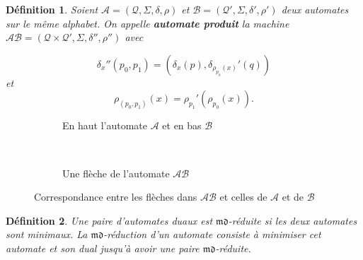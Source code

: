 \documentclass[11pt,a4paper]{article}
\newtheorem{definition}{Définition}
\begin{document}
\begin{definition}
  \label{def:produit}
  Soient $\mathcal{A} = \left(\mathcal{Q}, \Sigma, \delta, \rho\right)$ et $\mathcal{B} = \left(\mathcal{Q'}, \Sigma, \delta', \rho'\right)$ deux automates sur le même alphabet. On appelle \textbf{\textit{automate produit}} la machine $\mathcal{AB} = \left(\mathcal{Q}\times\mathcal{Q'}, \Sigma, \delta'', \rho''\right)$ avec

\[ \delta_x''(p_0, p_1) = (\delta_x(p), \delta_{\rho_{p_0}(x)}'(q))\]
et
\[ \rho_{(p_0,p_1)}(x) = \rho_{p_1}'(\rho_{p_0}(x)). \]
\end{definition}

\begin{figure}[h!]
  \begin{subfigure}[b]{0.5\textwidth}
    \centering
    \caption{En haut l'automate $\mathcal{A}$ et en bas $\mathcal{B}$}
  \end{subfigure}
  ~
  \begin{subfigure}[b]{0.5\textwidth}
    \centering
    \caption{Une flèche de l'automate $\mathcal{AB}$}
  \end{subfigure}
  \caption{Correspondance entre les flèches dans $\mathcal{AB}$ et celles de $\mathcal{A}$ et de $\mathcal{B}$}
\end{figure}

\begin{definition}{\cite{DBLP:journals/corr/abs-1105-4725}}
  \label{def:md-red}
  Une paire d'automates duaux est $\mathfrak{md}$-réduite si les deux automates sont minimaux. La $\mathfrak{md}$-réduction d'un automate consiste à minimiser cet automate et son dual jusqu'à avoir une paire $\mathfrak{md}$-réduite.
\end{definition}
\end{document}
